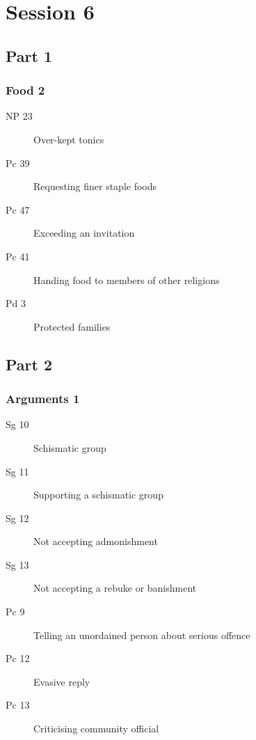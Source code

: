 \documentclass[11pt,oneside]{memoir}
\begin{document}
\chapter{Session 6}

\begin{multicols}{2}

\section{Part 1}

\subsection{Food 2}

\begin{description}
\item[NP 23] Over-kept tonics
\item[Pc 39] Requesting finer staple foods
\item[Pc 47] Exceeding an invitation
\item[Pc 41] Handing food to members of other religions
\item[Pd 3] Protected families
\end{description}

\columnbreak

\section{Part 2}

\subsection{Arguments 1}

\begin{description}
\item[Sg 10] Schismatic group
\item[Sg 11] Supporting a schismatic group
\item[Sg 12] Not accepting admonishment
\item[Sg 13] Not accepting a rebuke or banishment
\item[Pc 9] Telling an unordained person about serious offence
\item[Pc 12] Evasive reply
\item[Pc 13] Criticising community official
\end{description}

\end{multicols}
\end{document}
